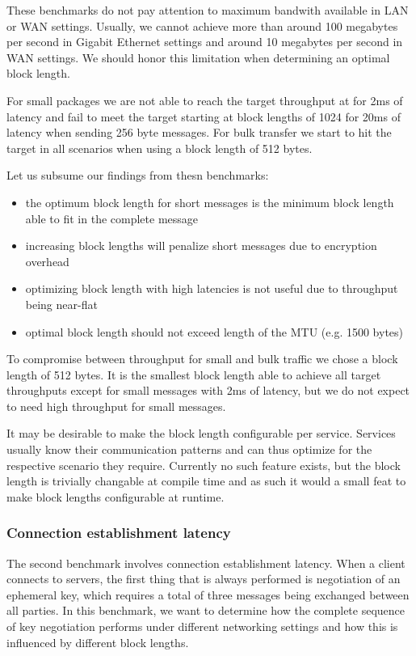 \medskip

These benchmarks do not pay attention to maximum bandwith available in LAN or WAN settings.
Usually, we cannot achieve more than around 100 megabytes per second in Gigabit Ethernet settings and around 10 megabytes per second in WAN settings.
We should honor this limitation when determining an optimal block length.

For small packages we are not able to reach the target throughput at for 2ms of latency and fail to meet the target starting at block lengths of 1024 for 20ms of latency when sending 256 byte messages.
For bulk transfer we start to hit the target in all scenarios when using a block length of 512 bytes.

\medskip

Let us subsume our findings from thesn benchmarks:
\begin{itemize}
    \item the optimum block length for short messages is the minimum block length able to fit in the complete message
    \item increasing block lengths will penalize short messages due to encryption overhead
    \item optimizing block length with high latencies is not useful due to throughput being near-flat
    \item optimal block length should not exceed length of the MTU (e.g. 1500 bytes)
\end{itemize}

To compromise between throughput for small and bulk traffic we chose a block length of 512 bytes.
It is the smallest block length able to achieve all target throughputs except for small messages with 2ms of latency, but we do not expect to need high throughput for small messages.

It may be desirable to make the block length configurable per service.
Services usually know their communication patterns and can thus optimize for the respective scenario they require.
Currently no such feature exists, but the block length is trivially changable at compile time and as such it would a small feat to make block lengths configurable at runtime.

\subsubsection{Connection establishment latency}

The second benchmark involves connection establishment latency.
When a client connects to servers, the first thing that is always performed is negotiation of an ephemeral key, which requires a total of three messages being exchanged between all parties.
In this benchmark, we want to determine how the complete sequence of key negotiation performs under different networking settings and how this is influenced by different block lengths.

